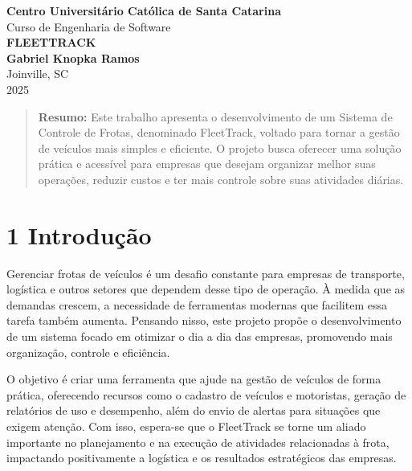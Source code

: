 \documentclass[12pt]{article}
\begin{document}
\begin{titlepage}
\centering

{\Huge \textbf{Centro Universitário Católica de Santa Catarina}}\\[1.5cm]
{\Large Curso de Engenharia de Software}\\[4cm]
{\huge \textbf{FLEETTRACK}}\\[2cm]
{\Large \textbf{Gabriel Knopka Ramos}}\\[6cm]
{\Large Joinville, SC}\\[1.5cm]
{\Large 2025}

\vfill

\end{titlepage}

\newpage

\begin{abstract}
\noindent \textbf{Resumo:} Este trabalho apresenta o desenvolvimento de um Sistema de Controle de Frotas, denominado FleetTrack, voltado para tornar a gestão de veículos mais simples e eficiente. O projeto busca oferecer uma solução prática e acessível para empresas que desejam organizar melhor suas operações, reduzir custos e ter mais controle sobre suas atividades diárias.
\end{abstract}

\vspace{1cm}

\section*{1 Introdução}
Gerenciar frotas de veículos é um desafio constante para empresas de transporte, logística e outros setores que dependem desse tipo de operação. À medida que as demandas crescem, a necessidade de ferramentas modernas que facilitem essa tarefa também aumenta. Pensando nisso, este projeto propõe o desenvolvimento de um sistema focado em otimizar o dia a dia das empresas, promovendo mais organização, controle e eficiência.

O objetivo é criar uma ferramenta que ajude na gestão de veículos de forma prática, oferecendo recursos como o cadastro de veículos e motoristas, geração de relatórios de uso e desempenho, além do envio de alertas para situações que exigem atenção. Com isso, espera-se que o FleetTrack se torne um aliado importante no planejamento e na execução de atividades relacionadas à frota, impactando positivamente a logística e os resultados estratégicos das empresas.

\newpage
\end{document}
